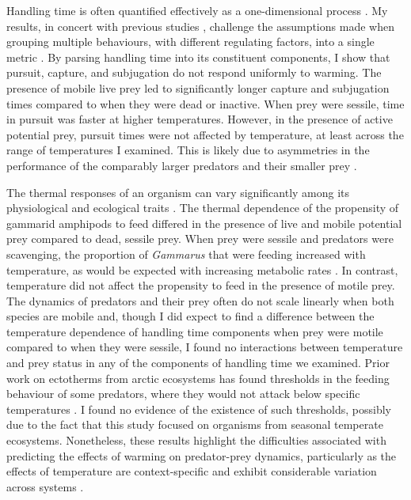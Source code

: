 Handling time is often quantified effectively as a one-dimensional process \citep{jeschke2002}. My results, in concert with previous studies \citep{jeschke2002, sentis2013}, challenge the assumptions made when grouping multiple behaviours, with different regulating factors, into a single metric \citep{enlund2011, sentis2013}. By parsing handling time into its constituent components, I show that pursuit, capture, and subjugation do not respond uniformly to warming. The presence of mobile live prey led to significantly longer capture and subjugation times compared to when they were dead or inactive. When prey were sessile, time in pursuit was faster at higher temperatures. However, in the presence of active potential prey, pursuit times were not affected by temperature, at least across the range of temperatures I examined. This is likely due to asymmetries in the performance of the comparably larger predators and their smaller prey \citep{dell2014}.  

The thermal responses of an organism can vary significantly among its physiological and ecological traits \citep{dell2011}. The thermal dependence of the propensity of gammarid amphipods to feed differed in the presence of live and mobile potential prey compared to dead, sessile prey. When prey were sessile and predators were scavenging, the proportion of \emph{Gammarus} that were feeding increased with temperature, as would be expected with increasing metabolic rates \citep{brown2004, schmidlin2015, labaude2016}.  In contrast, temperature did not affect the propensity to feed in the presence of motile prey. The dynamics of predators and their prey often do not scale linearly when both species are mobile \citep{dell2014} and, though I did expect to find a difference between the temperature dependence of handling time components when prey were motile compared to when they were sessile, I found no interactions between temperature and prey status in any of the components of handling time we examined. Prior work on ectotherms from arctic ecosystems has found thresholds in the feeding behaviour of some predators, where they would not attack below specific temperatures \citep{ohlund2015}. I found no evidence of the existence of such thresholds, possibly due to the fact that this study focused on organisms from seasonal temperate ecosystems. Nonetheless, these results highlight the difficulties associated with predicting the effects of warming on predator-prey dynamics, particularly as the effects of temperature are context-specific and exhibit considerable variation across systems \citep{enlund2011, ohlund2015}. 

